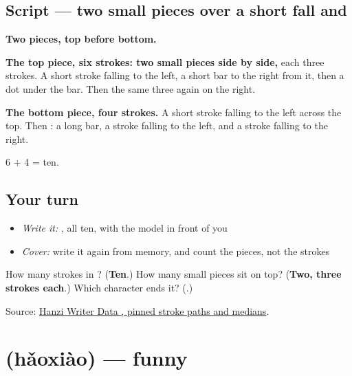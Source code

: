 \subsection*{Script — two small pieces over a short fall and }

\begin{quote}
\end{quote}

\textbf{Two pieces, top before bottom.}

\textbf{The top piece, six strokes: two small pieces side by side,} each three strokes. A short stroke falling to the left, a short bar to the right from it, then a dot under the bar. Then the same three again on the right.

\textbf{The bottom piece, four strokes.} A short stroke falling to the left across the top. Then : a long bar, a stroke falling to the left, and a stroke falling to the right.

6 + 4 = ten.

\subsection*{Your turn}
\begin{itemize}
\raggedright
  \item \emph{Write it:} , all ten, with the model in front of you
  \item \emph{Cover:} write it again from memory, and count the pieces, not the strokes
\end{itemize}

\begin{tcolorbox}[breakable,colback=teal!4,colframe=teal!35!black,title={Before you move on}]
How many strokes in ? (\textbf{Ten}.) How many small pieces sit on top? (\textbf{Two, three strokes each}.) Which character ends it? (\textbf{}.)

Source: \href{https://raw.githubusercontent.com/chanind/hanzi-writer-data/68d10a4b21150cae5e1ebbd223eed289cf32d90c/data/\%E7\%AC\%91.json}{Hanzi Writer Data , pinned stroke paths and medians}.
\end{tcolorbox}
\section[\texorpdfstring{\zh{好笑} (hǎoxiào)}{好笑 (hǎoxiào)}]{ (hǎoxiào) — funny}

